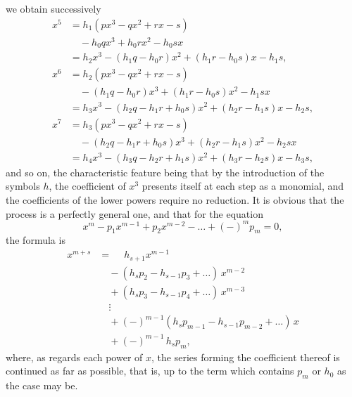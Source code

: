 \documentclass[11pt,a4paper]{article}
\providecommand{\textsc}[1]{{\scshape #1}}
\begin{document}
\fancyhead[C]{\small\textsc{on mr anglin's formula.}}
\fancyhead[R]{\small [803}

\thispagestyle{plain}
\noindent we obtain successively
\[
\begin{aligned}
x^{5} &= h_{1}(px^{3} - qx^{2} + rx - s)\\
      &\quad - h_{0}qx^{3} + h_{0}rx^{2} - h_{0}sx\\
      &= h_{2}x^{3} - (h_{1}q - h_{0}r)x^{2} + (h_{1}r - h_{0}s)x - h_{1}s,\\[4pt]
x^{6} &= h_{2}(px^{3} - qx^{2} + rx - s)\\
      &\quad - (h_{1}q - h_{0}r)x^{3} + (h_{1}r - h_{0}s)x^{2} - h_{1}sx\\
      &= h_{3}x^{3} - (h_{2}q - h_{1}r + h_{0}s)x^{2} + (h_{2}r - h_{1}s)x - h_{2}s,\\[4pt]
x^{7} &= h_{3}(px^{3} - qx^{2} + rx - s)\\
      &\quad - (h_{2}q - h_{1}r + h_{0}s)x^{3} + (h_{2}r - h_{1}s)x^{2} - h_{2}sx\\
      &= h_{4}x^{3} - (h_{3}q - h_{2}r + h_{1}s)x^{2} + (h_{3}r - h_{2}s)x - h_{3}s,
\end{aligned}
\]
and so on, the characteristic feature being that by the introduction of the symbols $h$, the coefficient of $x^{3}$ presents itself at each step as a monomial, and the coefficients of the lower powers require no reduction.  It is obvious that the process is a perfectly general one, and that for the equation
\[
x^{m} - p_{1}x^{m-1} + p_{2}x^{m-2} - \ldots + (-)^{m} p_{m} = 0,
\]
the formula is
\[
\begin{aligned}
x^{m+s} &= \phantom{-}h_{s+1}x^{m-1}\\
        &\quad - (h_{s}p_{2} - h_{s-1}p_{3} + \ldots)\,x^{m-2}\\
        &\quad + (h_{s}p_{3} - h_{s-1}p_{4} + \ldots)\,x^{m-3}\\
        &\quad \vdots\\
        &\quad + (-)^{m-1}(h_{s}p_{m-1} - h_{s-1}p_{m-2} + \ldots)\,x\\
        &\quad + (-)^{m-1}\,h_{s}p_{m},
\end{aligned}
\]
where, as regards each power of $x$, the series forming the coefficient thereof is continued as far as possible, that is, up to the term which contains $p_{m}$ or $h_{0}$ as the case may be.
\clearpage
\end{document}
